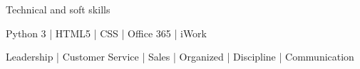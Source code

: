 

\begin{cventries}

  \cventry
    {Technical and soft skills}
    {} 
    {}
    {}
    {
      \begin{cvitems} %
      \item {Python 3 | HTML5 | CSS | Office 365 | iWork}
      \item {Leadership | Customer Service | Sales | Organized | Discipline | Communication}
      \end{cvitems}
    }
\end{cventries}
